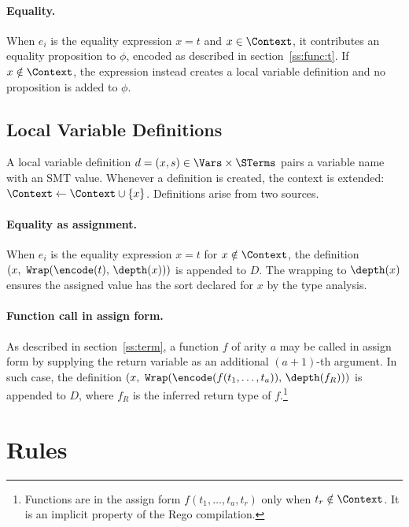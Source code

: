 \paragraph{Equality.}
When $e_i$ is the equality expression $x = t$ and $x \in \Context$, it contributes an equality proposition to $\phi$, encoded as described in section~\ref{ss:func:t}.
If $x \notin \Context$, the expression instead creates a local variable definition and no proposition is added to $\phi$.

\subsection{Local Variable Definitions}
\label{ss:expr:let}

A local variable definition $d = (x, s) \in \Vars \times \STerms$ pairs a variable name with an SMT value.
Whenever a definition is created, the context is extended: $\Context \leftarrow \Context \cup \{x\}$.
Definitions arise from two sources.

\paragraph{Equality as assignment.}
When $e_i$ is the equality expression $x = t$ for $x \notin \Context$, the definition $(x,\ \texttt{Wrap}(\encode(t),\, \depth(x)))$ is appended to $D$.
The wrapping to $\depth(x)$ ensures the assigned value has the sort declared for $x$ by the type analysis.

\paragraph{Function call in assign form.}
As described in section~\ref{ss:term}, a function $f$ of arity $a$ may be called in assign form by supplying the return variable as an additional $(a+1)$-th argument.
In such case, the definition $(x,\ \texttt{Wrap}(\encode(f(t_1, \dots, t_a)),\, \depth(f_R)))$ is appended to $D$, where $f_R$ is the inferred return type of $f$.\footnote{
  Functions are in the assign form $f(t_1, \dots, t_a, t_r)$ only when $t_r \notin \Context$.
  It is an implicit property of the Rego compilation.
}

\section{Rules}

